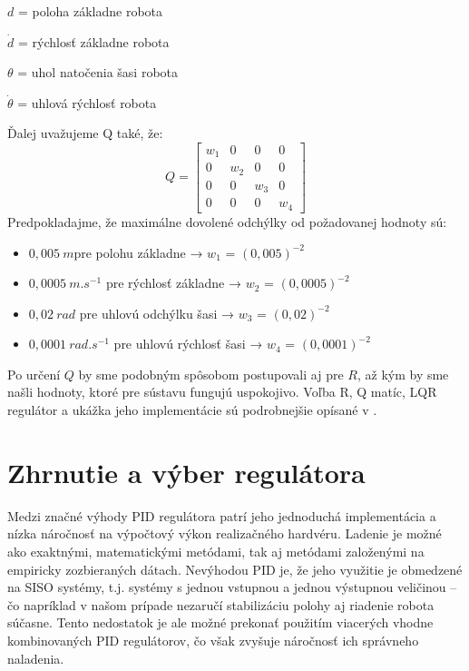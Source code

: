 \quad $d$ = poloha základne robota 

\quad $\dot{d}$ = rýchlosť  základne robota 

\quad $\theta$ = uhol natočenia šasi robota 

\quad $\dot{\theta}$ = uhlová rýchlosť robota

Ďalej uvažujeme Q také, že:
\begin{equation}
Q = \begin{bmatrix}
w_1 & 0 & 0 & 0 \\
0 & w_2 & 0 & 0 \\
0 & 0 & w_3 & 0 \\
0 & 0 & 0 & w_4
\end{bmatrix}
\end{equation}
\newline
Predpokladajme, že maximálne dovolené odchýlky od požadovanej hodnoty sú:
\begin{itemize}
\item $0,005~m $pre polohu základne → $w_1$ = $(0,005)^{-2}$
\item $0,0005~m.s^{-1}$ pre rýchlosť základne → $w_2$ = $(0,0005)^{-2}$
\item $0,02~rad$ pre uhlovú odchýlku šasi → $w_3$ = $(0,02)^{-2}$
\item $0,0001~rad.s^{-1}$ pre uhlovú rýchlosť šasi → $w_4$ = $(0,0001)^{-2}$
\end{itemize}

Po určení $Q$ by sme podobným spôsobom postupovali aj pre $R$, až kým by sme našli hodnoty, ktoré pre sústavu fungujú uspokojivo. Voľba R, Q matíc, LQR regulátor a ukážka jeho implementácie sú podrobnejšie opísané v \cite{LQRpaper}.

\section{Zhrnutie a výber regulátora}
Medzi značné výhody PID regulátora patrí jeho jednoduchá implementácia a nízka náročnosť na výpočtový výkon realizačného hardvéru. Ladenie je možné ako exaktnými, matematickými metódami, tak aj metódami založenými na empiricky zozbieraných dátach. Nevýhodou PID je,  že jeho využitie je obmedzené na \ac{SISO} systémy, t.j. systémy s jednou vstupnou a jednou výstupnou veličinou – čo napríklad v našom prípade nezaručí stabilizáciu polohy aj riadenie robota súčasne. Tento nedostatok je ale možné prekonať použitím viacerých vhodne kombinovaných PID regulátorov, čo však zvyšuje náročnosť ich správneho naladenia.


